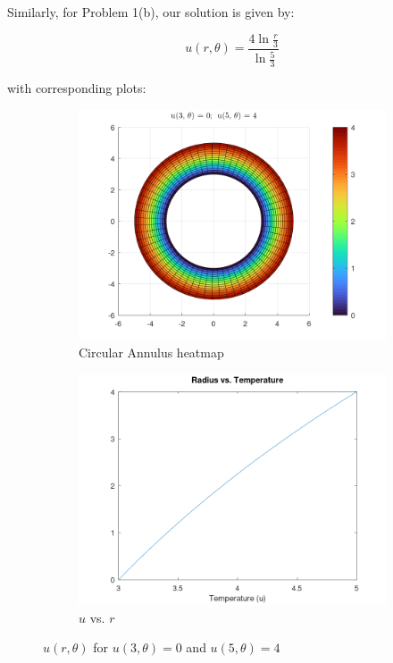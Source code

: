 Similarly, for Problem 1(b), our solution is given by:

$$
u(r, \theta) = \frac{4 \ln{\frac{r}{3}}}{\ln{\frac{5}{3}}}
$$

with corresponding plots:

\begin{figure}[h]
    \centering
    \begin{subfigure}[b]{0.475\textwidth}
        \centering
        \includegraphics[width=\textwidth]{problem_1b_heatmap.png}
        \caption{Circular Annulus heatmap}
    \end{subfigure}
    \hfill
    \begin{subfigure}[b]{0.475\textwidth}
        \centering
        \includegraphics[width=\textwidth]{problem_1b_u_vs_r.png}
        \caption{$u$ vs. $r$}
    \end{subfigure}
    \caption[]{$u(r, \theta)$ for $u(3, \theta) = 0$ and $u(5, \theta) = 4$}
\end{figure}


